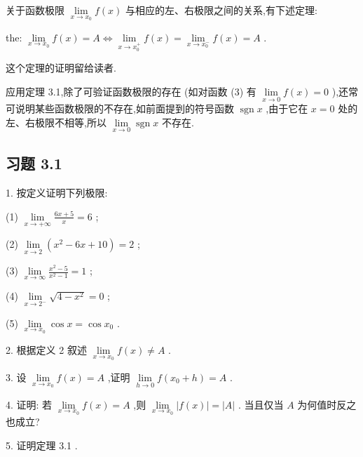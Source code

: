 关于函数极限 \(\mathop{\lim }\limits_{{x \rightarrow  {x}_{0}}}f\left( x\right)\) 与相应的左、右极限之间的关系,有下述定理:

\begin{theorem}{}{the:}
\(\mathop{\lim }\limits_{{x \rightarrow  {x}_{0}}}f\left( x\right)  = A \Leftrightarrow  \mathop{\lim }\limits_{{x \rightarrow  {x}_{0}^{ + }}}f\left( x\right)  = \mathop{\lim }\limits_{{x \rightarrow  {x}_{0}^{ - }}}f\left( x\right)  = A\) .
\end{theorem}


这个定理的证明留给读者.

应用定理 3.1,除了可验证函数极限的存在 (如对函数 (3) 有 \(\mathop{\lim }\limits_{{x \rightarrow  0}}f\left( x\right)  = 0\) ),还常可说明某些函数极限的不存在,如前面提到的符号函数 \(\operatorname{sgn}x\) ,由于它在 \(x = 0\) 处的左、右极限不相等,所以 \(\mathop{\lim }\limits_{{x \rightarrow  0}}\operatorname{sgn}x\) 不存在.

\subsection{习题 3.1}

1. 按定义证明下列极限:

(1) \(\mathop{\lim }\limits_{{x \rightarrow   + \infty }}\frac{{6x} + 5}{x} = 6\) ;

(2) \(\mathop{\lim }\limits_{{x \rightarrow  2}}\left( {{x}^{2} - {6x} + {10}}\right)  = 2\) ;

(3) \(\mathop{\lim }\limits_{{x \rightarrow  \infty }}\frac{{x}^{2} - 5}{{x}^{2} - 1} = 1\) ;

(4) \(\mathop{\lim }\limits_{{x \rightarrow  {2}^{ - }}}\sqrt{4 - {x}^{2}} = 0\) ;

(5) \(\mathop{\lim }\limits_{{x \rightarrow  {x}_{0}}}\cos x = \cos {x}_{0}\) .

2. 根据定义 2 叙述 \(\mathop{\lim }\limits_{{x \rightarrow  {x}_{0}}}f\left( x\right)  \neq  A\) .

3. 设 \(\mathop{\lim }\limits_{{x \rightarrow  {x}_{0}}}f\left( x\right)  = A\) ,证明 \(\mathop{\lim }\limits_{{h \rightarrow  0}}f\left( {{x}_{0} + h}\right)  = A\) .

4. 证明: 若 \(\mathop{\lim }\limits_{{x \rightarrow  {x}_{0}}}f\left( x\right)  = A\) ,则 \(\mathop{\lim }\limits_{{x \rightarrow  {x}_{0}}}\left| {f\left( x\right) }\right|  = \left| A\right|\) . 当且仅当 \(A\) 为何值时反之也成立?

5. 证明定理 3.1 .

